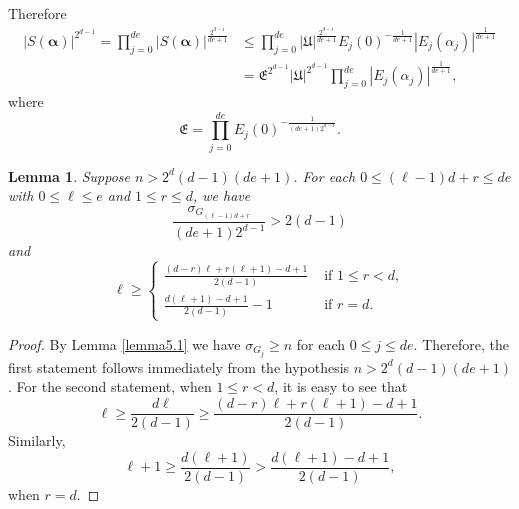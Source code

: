 \documentclass[12pt, reqno]{amsart}
\numberwithin{equation}{section}
\newcommand{\0}{\mathbf{0}}
\renewcommand{\leq}{\leqslant}
\renewcommand{\geq}{\geqslant}
\newcommand{\bal}{\boldsymbol{\alpha}}
\renewcommand{\=}{\equiv}
\newcommand{\1}{\mathbf{1}}
\newtheorem{lemma}[theorem]{Lemma}
\theoremstyle{definition}
\begin{document}
Therefore
\begin{equation}
\begin{split}
\label{decomp}
|S(\bal)|^{2^{d-1}}
=
\prod_{j = 0}^{de}  |S(\bal)|^{ \frac{2^{d-1}}{de + 1} }
&\leq
\prod_{j = 0}^{de}
|\mathfrak{U}|^{  \frac{2^{d-1}}{de + 1} }   E_{j} (0)^{  -  \frac{1}{de + 1} }
| E_{j} (\alpha_{j})  |^{  \frac{1}{de + 1} }
\\
&=
\mathfrak{E}^{2^{d-1}  }  |\mathfrak{U}|^{2^{d-1}  } \prod_{j = 0}^{de}    | E_j (\alpha_j)  |^{  \frac{1}{de + 1}  },
\end{split}
\end{equation}
where
\begin{equation}\label{eq:slab}
\mathfrak{E} = \prod_{ j = 0}^{de}
E_{j} (0) ^{  -  \frac{1}{ (de + 1) 2^{d-1}} }.
\end{equation}

\begin{lemma}\label{lem:slab}
Suppose $n > 2^{d} (d-1) (de + 1)$. For each $0 \leq  (\ell - 1) d + r \leq de$ with $0 \leq \ell \leq e$ and  $1 \leq r \leq d$, we have
$$
\frac{ \sigma_{G_{ (\ell - 1) d + r} }  }{ (de + 1) 2^{d-1}}   > 2 (d-1)
$$
and
$$
 \ell  
 \geq 
 \begin{cases}
   \frac{ (d-r) \ell  + r (\ell + 1) - d + 1}{ 2(d-1) } & \text{ if $1 \leq r < d$},\\
 \frac{ d (\ell + 1)  - d + 1}{ 2 (d-1) }-1 & \text{ if $r = d$}.
 \end{cases}
$$
\end{lemma}
\begin{proof}
By Lemma \ref{lemma5.1} we have $\sigma_{G_j} \geq n$ for each $0 \leq j \leq de$. Therefore,
the first statement follows immediately from the hypothesis $n > 2^{d} (d-1)(de + 1)$. For the second statement, when $1\leq r<d$, 
it is easy to see that
$$
\ell  \geq    \frac{  d \ell  }{ 2(d-1) } \geq    \frac{ (d-r) \ell  + r (\ell + 1) - d + 1}{ 2(d-1) }.
$$
Similarly, 
$$
\ell + 1  \geq \frac{ d (\ell + 1) }{ 2 (d-1) } > \frac{ d (\ell + 1)  - d + 1}{ 2 (d-1) } , 
$$
when  $r=d$.
\end{proof}
\end{document}
